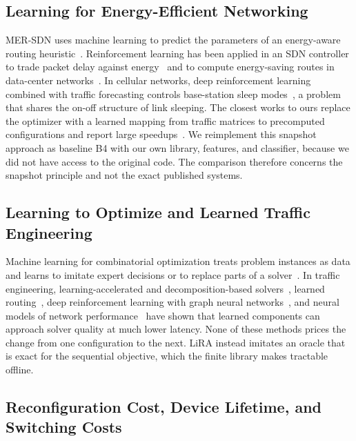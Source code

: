 \documentclass[journal]{IEEEtran}
\begin{document}
\subsection{Learning for Energy-Efficient Networking}

MER-SDN uses machine learning to predict the parameters of an energy-aware routing heuristic~\cite{assefa2018mersdn}. Reinforcement learning has been applied in an SDN controller to trade packet delay against energy~\cite{frohlich2021rl} and to compute energy-saving routes in data-center networks~\cite{zheng2022energysaving}. In cellular networks, deep reinforcement learning combined with traffic forecasting controls base-station sleep modes~\cite{wu2021deepbsc}, a problem that shares the on-off structure of link sleeping. The closest works to ours replace the optimizer with a learned mapping from traffic matrices to precomputed configurations and report large speedups~\cite{gomezdelahiz2025noms,gomezdelahiz2026tgcn}. We reimplement this snapshot approach as baseline B4 with our own library, features, and classifier, because we did not have access to the original code. The comparison therefore concerns the snapshot principle and not the exact published systems.

\subsection{Learning to Optimize and Learned Traffic Engineering}

Machine learning for combinatorial optimization treats problem instances as data and learns to imitate expert decisions or to replace parts of a solver~\cite{bengio2021mlco}. In traffic engineering, learning-accelerated and decomposition-based solvers~\cite{xu2023teal,perry2023dote,abuzaid2021ncflow,narayanan2021pop}, learned routing~\cite{valadarsky2017learning}, deep reinforcement learning with graph neural networks~\cite{almasan2022enero,bernardez2023magnneto}, and neural models of network performance~\cite{rusek2020routenet} have shown that learned components can approach solver quality at much lower latency. None of these methods prices the change from one configuration to the next. LiRA instead imitates an oracle that is exact for the sequential objective, which the finite library makes tractable offline.

\subsection{Reconfiguration Cost, Device Lifetime, and Switching Costs}
\end{document}
